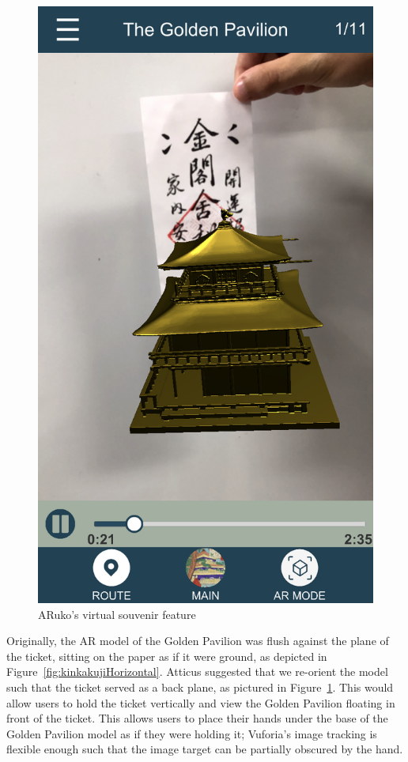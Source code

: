 \documentclass[a4paper, 10pt, american, titlepage]{article}
\begin{document}
\begin{figure}[p]
	\centering
	\includegraphics[width=.8\textwidth]{souvenir.png}
	\caption{ARuko's virtual souvenir feature}
	\label{fig:souvenir}
\end{figure}

Originally, the AR model of the Golden Pavilion was flush against the plane of
the ticket, sitting on the paper as if it were ground, as depicted in
Figure~\ref{fig:kinkakujiHorizontal}. Atticus suggested that we re-orient the
model such that the ticket served as a back plane, as pictured in
Figure~\ref{fig:souvenir}. This would allow users to hold the ticket vertically
and view the Golden Pavilion floating in front of the ticket. This allows users
to place their hands under the base of the Golden Pavilion model as if they were
holding it; Vuforia's image tracking is flexible enough such that the image
target can be partially obscured by the hand.
\end{document}
